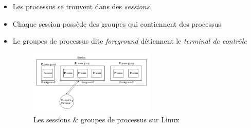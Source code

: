 \begin{frame}
	\begin{itemize}
		\item Les processus se trouvent dans des \textit{sessions}
		\item Chaque session possède des groupes qui contiennent des processus
		\item Le groupes de processus dite \textit{foreground} détiennent le \textit{terminal de contrôle}
			\begin{figure}
				\centering
				\includegraphics[width=6cm]{images/controlling_terminal.png}
				\caption{Les sessions \& groupes de processus sur Linux}
			\end{figure}
	\end{itemize}
\end{frame}
